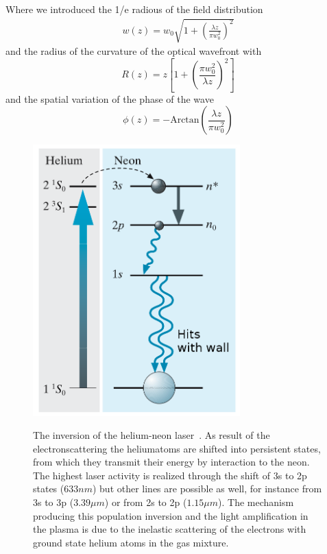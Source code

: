 Where we introduced the 1/e radious of the field distribution
\begin{align}
    w(z) = w_0 \sqrt{ 1 +\left (\frac{\lambda z}{\pi w_0^2} \right )^2}
\end{align}
and the radius of the curvature of the optical wavefront with
\begin{equation}
    R(z) = z \left[ 1 + \left( \frac{\pi w_0^2}{\lambda z} \right)^2 \right]
\end{equation}
and the spatial variation of the phase of the wave
\begin{equation}
    \phi(z) = - \mathrm{Arctan} \left( \frac{\lambda z}{\pi w_0^2} \right) 
\end{equation}

\begin{figure}
    \begin{centering}
        \caption{The inversion of the helium-neon laser~\cite{christian2003gerthsen}. 
            As result of the electronscattering the
    heliumatoms are shifted into persistent states, from which they transmit their energy by
    interaction to the neon. The highest laser activity is realized
    through the shift of 3s to 2p states ($633nm$) but other lines are possible as well,
    for instance from 3s to 3p ($3.39 \mu m$) or from 2s to 2p ($1.15\mu m$). The mechanism
    producing this population inversion and the light amplification in the plasma is due
    to the inelastic scattering of the electrons with ground state helium atoms in the gas
    mixture.}
        \includegraphics[width=8cm]{figures/helium-neon-laser}
        \label{fig:integral}
    \end{centering}
\end{figure}

